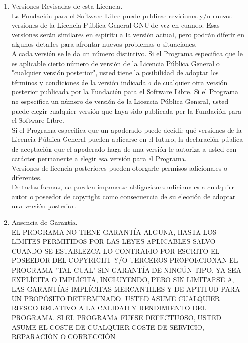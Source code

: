 \begin{enumerate}
		\item Versiones Revisadas de esta Licencia.\\
		
		La Fundación para el Software Libre puede publicar revisiones y/o nuevas versiones de la Licencia Pública General GNU de vez en cuando. Esas versiones serán similares en espíritu a la versión actual, pero podrán diferir en algunos detalles para afrontar nuevos problemas o situaciones.\\
		
		A cada versión se le da un número distintivo. Si el Programa especifica que le es aplicable cierto número de versión de la Licencia Pública General o "cualquier versión posterior", usted tiene la posibilidad de adoptar los términos y condiciones de la versión indicada o de cualquier otra versión posterior publicada por la Fundación para el Software Libre. Si el Programa no especifica un número de versión de la Licencia Pública General, usted puede elegir cualquier versión que haya sido publicada por la Fundación para el Software Libre.\\
		
		Si el Programa especifica que un apoderado puede decidir qué versiones de la Licencia Pública General pueden aplicarse en el futuro, la declaración pública de aceptación que el apoderado haga de una versión le autoriza a usted con carácter permanente a elegir esa versión para el Programa.\\
		
		Versiones de licencia posteriores pueden otorgarle permisos adicionales o diferentes.\\
		
		De todas formas, no pueden imponerse obligaciones adicionales a cualquier autor o poseedor de copyright como consecuencia de su elección de adoptar una versión posterior.\\
		
		\item Ausencia de Garantía.\\
		
		EL PROGRAMA NO TIENE GARANTÍA ALGUNA, HASTA LOS LÍMITES PERMITIDOS POR LAS LEYES APLICABLES SALVO CUANDO SE ESTABLEZCA LO CONTRARIO POR ESCRITO EL POSEEDOR DEL COPYRIGHT Y/O TERCEROS PROPORCIONAN EL PROGRAMA "TAL CUAL" SIN GARANTÍA DE NINGÚN TIPO, YA SEA EXPLÍCITA O IMPLÍCITA, INCLUYENDO, PERO SIN LIMITARSE A, LAS GARANTÍAS IMPLÍCITAS MERCANTILES Y DE APTITUD PARA UN PROPÓSITO DETERMINADO. USTED ASUME CUALQUIER RIESGO RELATIVO A LA CALIDAD Y RENDIMIENTO DEL PROGRAMA. SI EL PROGRAMA FUESE DEFECTUOSO, USTED ASUME EL COSTE DE CUALQUIER COSTE DE SERVICIO, REPARACIÓN O CORRECCIÓN.\\
		

\end{enumerate}
